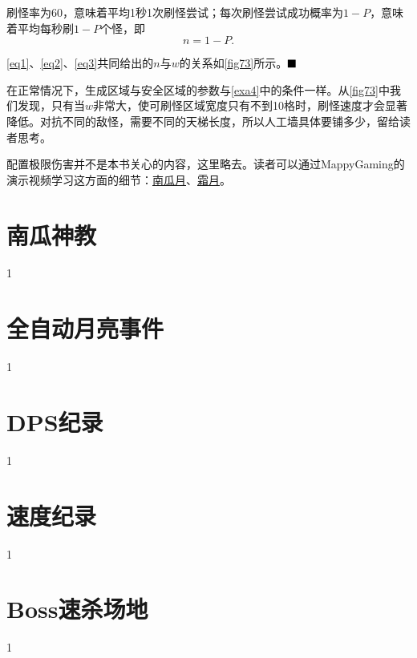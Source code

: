 \begin{solution}
刷怪率为60，意味着平均1秒1次刷怪尝试；每次刷怪尝试成功概率为$1-P$，意味着平均每秒刷$1-P$个怪，即
\begin{equation}\label{eq3}
n=1-P.
\end{equation}

\eqref{eq1}、\eqref{eq2}、\eqref{eq3}共同给出的$n$与$w$的关系如\autoref{fig73}所示。$\hfill\blacksquare$

\begin{figure}[!ht]
\centering
{}
\caption{}\label{fig73}
\end{figure}
\end{solution}

在正常情况下，生成区域与安全区域的参数与\autoref{exa4}中的条件一样。从\autoref{fig73}中我们发现，只有当$w$非常大，使可刷怪区域宽度只有不到10格时，刷怪速度才会显著降低。对抗不同的敌怪，需要不同的天梯长度，所以人工墙具体要铺多少，留给读者思考。

配置极限伤害并不是本书关心的内容，这里略去。读者可以通过MappyGaming的演示视频学习这方面的细节：\href{https://www.bilibili.com/video/av5356226/?p=5}{南瓜月}、\href{https://www.bilibili.com/video/av5356226/?p=6}{霜月}。


\section{南瓜神教}
1

\section{全自动月亮事件}
1

\section{DPS纪录}
1

\section{速度纪录}
1

\section{Boss速杀场地}
1
